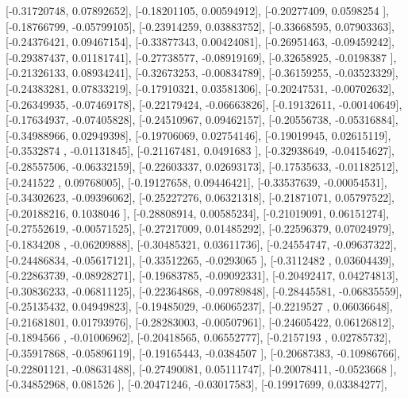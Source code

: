 \documentclass{article}
\begin{document}
       [-0.31720748,  0.07892652],
       [-0.18201105,  0.00594912],
       [-0.20277409,  0.0598254 ],
       [-0.18766799, -0.05799105],
       [-0.23914259,  0.03883752],
       [-0.33668595,  0.07903363],
       [-0.24376421,  0.09467154],
       [-0.33877343,  0.00424081],
       [-0.26951463, -0.09459242],
       [-0.29387437,  0.01181741],
       [-0.27738577, -0.08919169],
       [-0.32658925, -0.0198387 ],
       [-0.21326133,  0.08934241],
       [-0.32673253, -0.00834789],
       [-0.36159255, -0.03523329],
       [-0.24383281,  0.07833219],
       [-0.17910321,  0.03581306],
       [-0.20247531, -0.00702632],
       [-0.26349935, -0.07469178],
       [-0.22179424, -0.06663826],
       [-0.19132611, -0.00140649],
       [-0.17634937, -0.07405828],
       [-0.24510967,  0.09462157],
       [-0.20556738, -0.05316884],
       [-0.34988966,  0.02949398],
       [-0.19706069,  0.02754146],
       [-0.19019945,  0.02615119],
       [-0.3532874 , -0.01131845],
       [-0.21167481,  0.0491683 ],
       [-0.32938649, -0.04154627],
       [-0.28557506, -0.06332159],
       [-0.22603337,  0.02693173],
       [-0.17535633, -0.01182512],
       [-0.241522  ,  0.09768005],
       [-0.19127658,  0.09446421],
       [-0.33537639, -0.00054531],
       [-0.34302623, -0.09396062],
       [-0.25227276,  0.06321318],
       [-0.21871071,  0.05797522],
       [-0.20188216,  0.1038046 ],
       [-0.28808914,  0.00585234],
       [-0.21019091,  0.06151274],
       [-0.27552619, -0.00571525],
       [-0.27217009,  0.01485292],
       [-0.22596379,  0.07024979],
       [-0.1834208 , -0.06209888],
       [-0.30485321,  0.03611736],
       [-0.24554747, -0.09637322],
       [-0.24486834, -0.05617121],
       [-0.33512265, -0.0293065 ],
       [-0.3112482 ,  0.03604439],
       [-0.22863739, -0.08928271],
       [-0.19683785, -0.09092331],
       [-0.20492417,  0.04274813],
       [-0.30836233, -0.06811125],
       [-0.22364868, -0.09789848],
       [-0.28445581, -0.06835559],
       [-0.25135432,  0.04949823],
       [-0.19485029, -0.06065237],
       [-0.2219527 ,  0.06036648],
       [-0.21681801,  0.01793976],
       [-0.28283003, -0.00507961],
       [-0.24605422,  0.06126812],
       [-0.1894566 , -0.01006962],
       [-0.20418565,  0.06552777],
       [-0.2157193 ,  0.02785732],
       [-0.35917868, -0.05896119],
       [-0.19165443, -0.0384507 ],
       [-0.20687383, -0.10986766],
       [-0.22801121, -0.08631488],
       [-0.27490081,  0.05111747],
       [-0.20078411, -0.0523668 ],
       [-0.34852968,  0.081526  ],
       [-0.20471246, -0.03017583],
       [-0.19917699,  0.03384277],
\end{document}
